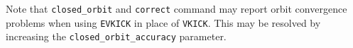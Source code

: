 Note that \verb|closed_orbit| and \verb|correct| command may report orbit convergence problems 
when using \verb|EVKICK| in place of \verb|VKICK|. This may be resolved by increasing the
\verb|closed_orbit_accuracy| parameter.
